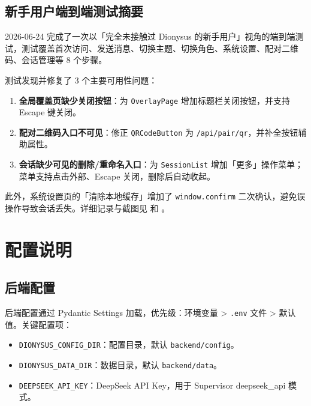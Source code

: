 \documentclass[12pt,a4paper]{article}
\begin{document}
\subsection{新手用户端到端测试摘要}

2026-06-24 完成了一次以「完全未接触过 Dionysus 的新手用户」视角的端到端测试，测试覆盖首次访问、发送消息、切换主题、切换角色、系统设置、配对二维码、会话管理等 8 个步骤。

测试发现并修复了 3 个主要可用性问题：

\begin{enumerate}[leftmargin=2em]
  \item \textbf{全局覆盖页缺少关闭按钮}：为 \texttt{OverlayPage} 增加标题栏关闭按钮，并支持 Escape 键关闭。
  \item \textbf{配对二维码入口不可见}：修正 \texttt{QRCodeButton} 为 \texttt{/api/pair/qr}，并补全按钮辅助属性。
  \item \textbf{会话缺少可见的删除/重命名入口}：为 \texttt{SessionList} 增加「更多」操作菜单；菜单支持点击外部、Escape 关闭，删除后自动收起。
\end{enumerate}

此外，系统设置页的「清除本地缓存」增加了 \texttt{window.confirm} 二次确认，避免误操作导致会话丢失。详细记录与截图见  和 。

\section{配置说明}

\subsection{后端配置}

后端配置通过 Pydantic Settings 加载，优先级：环境变量 > \texttt{.env} 文件 > 默认值。关键配置项：

\begin{itemize}[leftmargin=2em]
  \item \texttt{DIONYSUS\_CONFIG\_DIR}：配置目录，默认 \texttt{backend/config}。
  \item \texttt{DIONYSUS\_DATA\_DIR}：数据目录，默认 \texttt{backend/data}。
  \item \texttt{DEEPSEEK\_API\_KEY}：DeepSeek API Key，用于 Supervisor deepseek\_api 模式。
\end{itemize}
\end{document}
